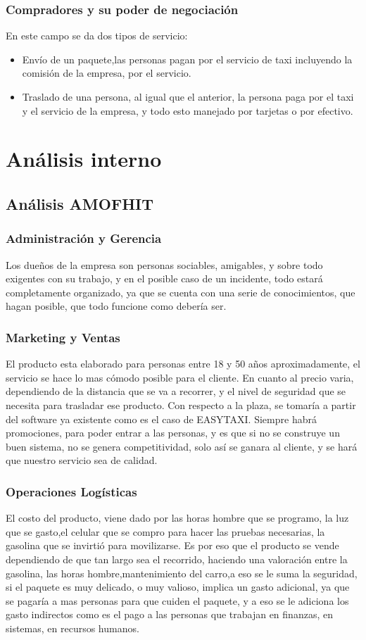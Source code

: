 \subsubsection{Compradores y su poder de negociación}
En este campo se da dos tipos de servicio:
\begin{itemize}
    \item Envío de un paquete,las personas pagan por el servicio de taxi incluyendo la comisión de la empresa, por el servicio.
    \item Traslado de una persona, al igual que el anterior, la persona paga por el taxi y el servicio de la empresa, y todo esto manejado por tarjetas o por efectivo. 
\end{itemize}
\section{Análisis interno}

\subsection{Análisis AMOFHIT}
\subsubsection{Administración y Gerencia}
Los dueños de la empresa son personas sociables, amigables, y sobre todo exigentes con su trabajo, y en el posible caso de un incidente, todo estará completamente organizado, ya que se cuenta con una serie de conocimientos, que hagan posible, que todo funcione como debería ser. 
\subsubsection{Marketing y Ventas}
El producto esta elaborado para personas entre 18 y 50 años aproximadamente, el servicio se hace lo mas cómodo posible para el cliente.
En cuanto al precio varia, dependiendo de la distancia que se va a recorrer, y el nivel de seguridad que se necesita para trasladar ese producto.
Con respecto a la plaza, se tomaría a partir del software ya existente como es el caso de EASYTAXI. Siempre habrá promociones, para poder entrar a las personas, y es que si no se construye un buen sistema, no se genera competitividad, solo así se ganara al cliente, y se hará que nuestro servicio sea de calidad.  
\subsubsection{Operaciones Logísticas}
El costo del producto, viene dado por las horas hombre que se programo, la luz que se gasto,el celular que se compro para hacer las pruebas necesarias, la gasolina que se invirtió para movilizarse. Es por eso que el producto se vende dependiendo de que tan largo sea el recorrido, haciendo una valoración entre la gasolina, las horas hombre,mantenimiento del carro,a eso se le suma la seguridad, si el paquete es muy delicado, o muy valioso, implica un gasto adicional, ya que se pagaría a mas personas para que cuiden el paquete, y a eso se le adiciona los gasto indirectos como es el pago a las personas que trabajan en finanzas, en sistemas, en recursos humanos.   
